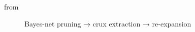 \documentclass[
  11pt,
  letterpaper,
]{book}
\begin{document}
from \textcite{gruetzemacher2022}

\begin{figure}


\caption[Bayes-net pruning → crux extraction →
re-expansion]{\label{fig-bayesnet-crux-flow}Bayes-net pruning → crux
extraction → re-expansion}

\end{figure}%
\end{document}
